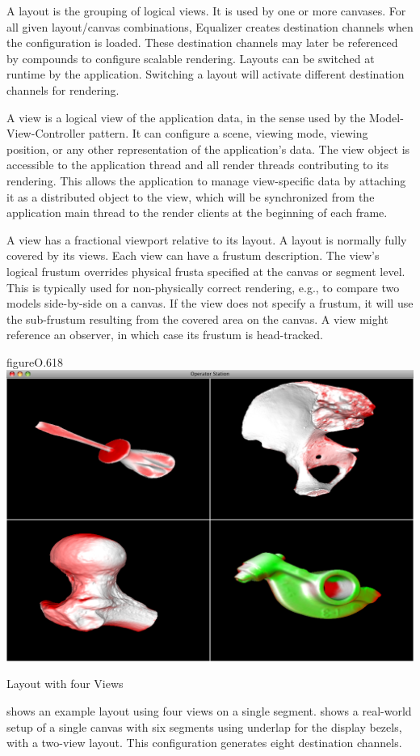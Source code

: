 A \textsf{layout} is the grouping of logical views. It is used by one or more
canvases. For all given layout/canvas combinations, Equalizer creates
destination channels when the configuration is loaded. These destination
channels may later be referenced by compounds to configure scalable rendering.
Layouts can be switched at runtime by the application. Switching a layout will
activate different destination channels for rendering.

A \textsf{view} is a logical view of the application data, in the sense used by
the Model-View-Controller pattern. It can configure a scene, viewing mode,
viewing position, or any other representation of the application's data. The
view object is accessible to the application thread and all render threads
contributing to its rendering. This allows the application to manage
view-specific data by attaching it as a distributed object to the view, which
will be synchronized from the application main thread to the render clients at the beginning of each frame.

A view has a fractional viewport relative to its layout. A layout is normally
fully covered by its views. Each view can have a frustum description. The
view's logical frustum overrides physical frusta specified at the canvas or
segment level. This is typically used for non-physically correct rendering,
e.g., to compare two models side-by-side on a canvas. If the view does not
specify a frustum, it will use the sub-frustum resulting from the covered area
on the canvas. A view might reference an observer, in which case its frustum is
head-tracked.

\begin{wrapfloat}{figure}{O}{.618\textwidth}
 \includegraphics[width=.618\textwidth]{images/layout.png}
 {\caption{\label{fLayout}Layout with four Views}}
\end{wrapfloat}

 shows an example layout using four views on a single segment.
 shows a real-world setup of a single canvas with six segments
using underlap for the display bezels, with a two-view layout. This
configuration generates eight destination channels.

